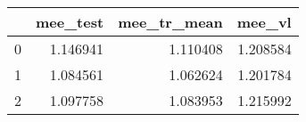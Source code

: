 \begin{tabular}{lrrr}
\toprule
{} &  mee\_test &  mee\_tr\_mean &    mee\_vl \\
\midrule
0 &  1.146941 &     1.110408 &  1.208584 \\
1 &  1.084561 &     1.062624 &  1.201784 \\
2 &  1.097758 &     1.083953 &  1.215992 \\
\bottomrule
\end{tabular}
